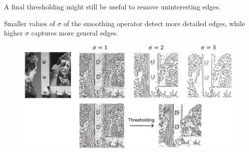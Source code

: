 \begin{remark}
    A final thresholding might still be useful to remove uninteresting edges.
\end{remark}

\begin{remark}
    Smaller values of $\sigma$ of the smoothing operator detect more detailed edges, 
    while higher $\sigma$ captures more general edges.
\end{remark}

\begin{figure}[H]
    \centering
    \includegraphics[width=0.8\linewidth]{./img/_example_laplacian_gaussian.pdf}
\end{figure}
